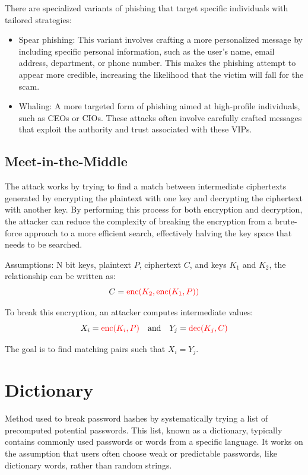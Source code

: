 There are specialized variants of phishing that target specific individuals with tailored strategies:
\begin{itemize}
    \item Spear phishing: This variant involves crafting a more personalized message by including specific personal information, such as the user’s name, email address, department, or phone number. This makes the phishing attempt to appear more credible, increasing the likelihood that the victim will fall for the scam.
    \item Whaling: A more targeted form of phishing aimed at high-profile individuals, such as CEOs or CIOs. These attacks often involve carefully crafted messages that exploit the authority and trust associated with these VIPs.
\end{itemize}

\begin{center}
    \section{Meet-in-the-Middle}
\end{center}

The attack works by trying to find a match between intermediate ciphertexts generated by encrypting the plaintext with one key and decrypting the ciphertext with another key. By performing this process for both encryption and decryption, the attacker can reduce the complexity of breaking the encryption from a brute-force approach to a more efficient search, effectively halving the key space that needs to be searched.

\hfill

\begin{tcolorbox}[colback=lightblue, colframe=blue!50!white, title=Process Overview]
    Assumptions:
    N bit keys, plaintext \( P \), ciphertext \( C \), and keys \( K_1 \) and \( K_2 \), the relationship can be written as:
    \[
    C = \textcolor{red}{\text{enc}(K_2, \text{enc}(K_1, P))}
    \]
    
    To break this encryption, an attacker computes intermediate values:
    \[
    X_i = \textcolor{red}{\text{enc}(K_i, P)} \quad \text{and} \quad Y_j = \textcolor{red}{\text{dec}(K_j, C)}
    \]
    
    The goal is to find matching pairs such that \( X_i = Y_j \).
\end{tcolorbox}

\centering
\section{Dictionary}
\raggedright
Method used to break password hashes by systematically trying a list of precomputed potential passwords. This list, known as a dictionary, typically contains commonly used passwords or words from a specific language. It works on the assumption that users often choose weak or predictable passwords, like dictionary words, rather than random strings.

